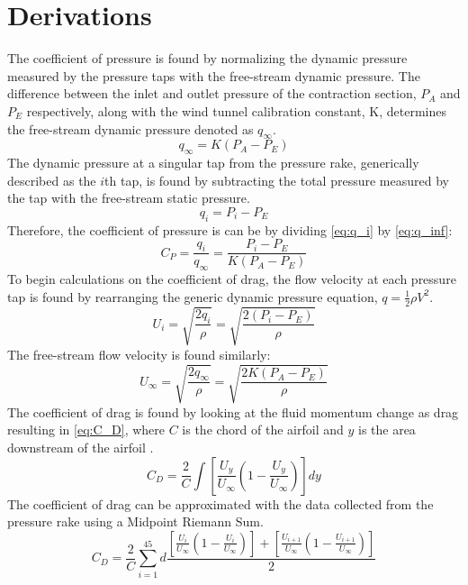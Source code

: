 \section{Derivations}
The coefficient of pressure is found by normalizing the dynamic pressure measured by the pressure taps with the free-stream dynamic pressure. The difference between the inlet and outlet pressure of the contraction section, $P_A$ and $P_E$ respectively, along with the wind tunnel calibration constant, K, determines the free-stream dynamic pressure denoted as $q_\infty$.
\begin{equation}\label{eq:q_inf}
    q_\infty = K (P_A - P_E)
\end{equation}
The dynamic pressure at a singular tap from the pressure rake, generically described as the $i$th tap, is found by subtracting the total pressure measured by the tap with the free-stream static pressure.
\begin{equation}\label{eq:q_i}
    q_i = P_i - P_E 
\end{equation}
Therefore, the coefficient of pressure is can be by dividing \autoref{eq:q_i} by \autoref{eq:q_inf}:
\begin{equation}\label{eq:C_P}
    C_P = \frac{q_i}{q_\infty} = \frac{P_i - P_E }{K (P_A - P_E)}
\end{equation}
To begin calculations on the coefficient of drag, the flow velocity at each pressure tap is found by rearranging the generic dynamic pressure equation, $q = \frac{1}{2}\rho V^2$.
\begin{equation}\label{eq:U_i}
    U_i = \sqrt{\frac{2 q_i}{\rho}} = \sqrt{\frac{2 (P_i - P_E)}{\rho}}
\end{equation}
The free-stream flow velocity is found similarly: 
\begin{equation}\label{eq:U_inf}
    U_\infty = \sqrt{\frac{2 q_\infty}{\rho}} = \sqrt{\frac{2 K (P_A - P_E)}{\rho}}
\end{equation}
The coefficient of drag is found by looking at the fluid momentum change as drag resulting in \autoref{eq:C_D}, where $C$ is the chord of the airfoil and $y$ is the area downstream of the airfoil \citep{lab6-manual}.
\begin{equation}\label{eq:C_D}
    C_D = \frac{2}{C} \int [\frac{U_y}{U_\infty}(1-\frac{U_y}{U_\infty})]dy
\end{equation}
The coefficient of drag can be approximated with the data collected from the pressure rake using a Midpoint Riemann Sum.
\begin{equation}
    C_D = \frac{2}{C} \sum_{i=1}^{45} d\frac{[\frac{U_i}{U_\infty}(1-\frac{U_i}{U_\infty})] + [\frac{U_{i+1}}{U_\infty}(1-\frac{U_{i+1}}{U_\infty})]}{2}
\end{equation}